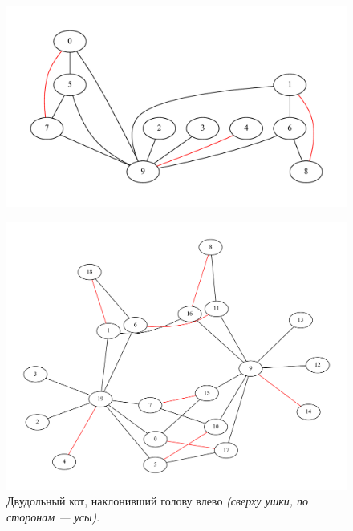 \begin{figure}[h]
    \centering
    \includegraphics[width=\textwidth]{images/big.pdf}
\end{figure}

\begin{figure}[h]
    \centering
    \includegraphics[width=\textwidth]{images/big_conv.pdf}
    \caption{Двудольный кот, наклонивший голову влево \textit{(сверху ушки, по сторонам --- усы)}.}
\end{figure}


